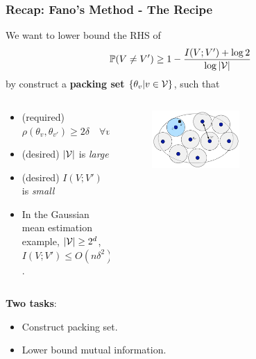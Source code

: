 \documentclass[10pt,xcolor={usenames,dvipsnames,table},aspectratio=169]{beamer}
\begin{document}
\begin{frame}
    \frametitle{Recap: Fano's Method - The Recipe}
    We want to lower bound the RHS of
     \[
     \mathbb{P}(V \neq V') \geq 1- \dfrac{I(V;V') + \log 2}{\log \left\lvert\mathcal{V}\right\rvert}
     \] 
    by construct a \textbf{packing set} $\left\{\theta_v| v\in \mathcal{V}\right\}$, such that 
    \begin{columns}
        \begin{column}{0.5\textwidth}
            \begin{itemize} 
                \item (required) $\rho(\theta_v, \theta_{v'}) \geq 2\delta \quad \forall v, v' \in \mathcal{V}$
                \item (desired) $\left\lvert\mathcal{V}\right\rvert$ is \textit{large}
                \item (desired) $I(V; V')$ is \textit{small}
                \item In the Gaussian mean estimation example, $\left\lvert\mathcal{V}\right\rvert \geq 2^{d}$, $I(V; V') \leq O(n \delta^2)$.
            \end{itemize}
        \end{column}
        \begin{column}{0.5\textwidth}
            \begin{figure}
                \centering
                \includegraphics[width=0.5\textwidth]{figures/packing-set.png}
            \end{figure}
        \end{column}
    \end{columns}


    \textbf{Two tasks}:
    \begin{itemize}
        \item Construct packing set.
        \item Lower bound mutual information.
    \end{itemize}
\end{frame}
\end{document}

